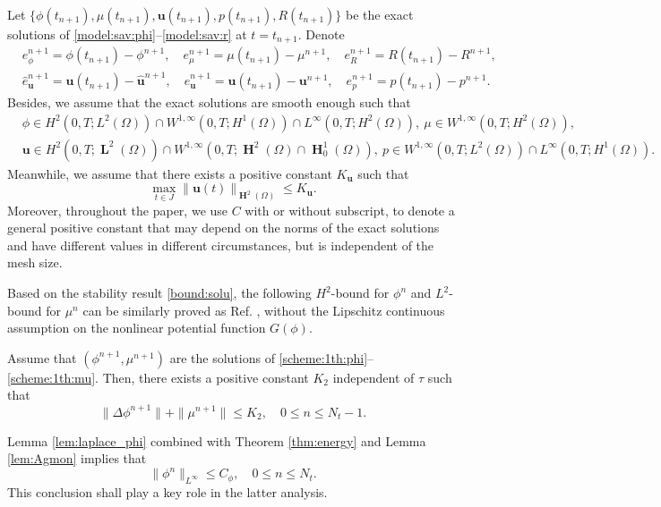Let $\{ \phi(t_{n+1}), \mu(t_{n+1}), \bm u(t_{n+1}),p(t_{n+1}), R(t_{n+1})\}$ be the exact solutions of \eqref{model:sav:phi}--\eqref{model:sav:r} at $t=t_{n+1}$.
Denote
\begin{equation*}  
	\begin{aligned}
		& e_\phi^{n+1}= \phi(t_{n+1})-\phi^{n+1}, \quad 
		e_\mu^{n+1}=\mu(t_{n+1})-\mu^{n+1}, \quad e_R^{n+1}=R(t_{n+1})- R^{n+1},\\ 
		& \widehat e_{\bm u}^{n+1}=\bm u(t_{n+1})-\widehat {\bm 
			u}^{n+1}, \quad  
		e_{\bm u}^{n+1}= \bm u(t_{n+1})-\bm u^{n+1}, \quad 
		e_p^{n+1}=p(t_{n+1})-p^{n+1}. 
	\end{aligned}
\end{equation*}
Besides, we assume that the exact solutions  are smooth enough such that
\begin{equation} \label{assump:e1}
	\begin{aligned}
		& \phi \in H^{2}(0,T; L^2(\Omega)) \cap W^{1, \infty}(0,T; H^1(\Omega)) \cap L^{\infty}(0,T; H^2(\Omega)), ~  \mu \in W^{1, \infty}(0,T; H^2(\Omega)),\\
		& \bm u \in H^{2}(0,T; \mbfL^2(\Omega)) \cap W^{1, \infty}(0,T;\mbfH^2(\Omega)\cap   \mbfH_0^1(\Omega)), ~ p \in W^{1, \infty}(0,T; L^2(\Omega))\cap L^{\infty}(0,T;H^1(\Omega)).
	\end{aligned}  
\end{equation}
Meanwhile, we assume that there exists a positive constant $K_{\bm u}$ such that
\begin{equation} \label{assump:e2}
	\max_{t \in J} \|\bm u(t)\|_{\mbfH^2(\Omega)} \leq K_{\bm u}.
\end{equation}
Moreover, throughout the paper, we use $C$ with or without subscript, to denote a general positive constant that may depend on the norms of the exact solutions and have different values in different circumstances, but is independent of the mesh size.

Based on the stability result \eqref{bound:solu}, the following $H^2$-bound for $\phi^n$ and $L^2$-bound for $\mu^n$ can be similarly proved as Ref. \cite{li2023global}, without the Lipschitz continuous assumption on the nonlinear potential function $G(\phi)$. 

\begin{lemma} \label{lem:laplace_phi}
	Assume that $(\phi^{n+1}, \mu^{n+1})$ are the solutions of \eqref{scheme:1th:phi}--\eqref{scheme:1th:mu}. %
	Then, there exists a positive constant $K_2$ independent of  $\tau$ such that 
	\begin{equation*} 
		\|\Delta \phi^{n+1}\|+\|\mu^{n+1}\| \leq  K_2, \quad 0 \leq n \leq N_t-1.
	\end{equation*}
\end{lemma}
Lemma \ref{lem:laplace_phi} combined with Theorem \ref{thm:energy} and Lemma \ref{lem:Agmon} implies that 
\begin{equation} \label{bound_phi}
	\|\phi^n\|_{L^\infty} \le C_{\phi}, \quad 0 \leq n \le N_t.
\end{equation}
This conclusion shall play a key role in the latter analysis. 

